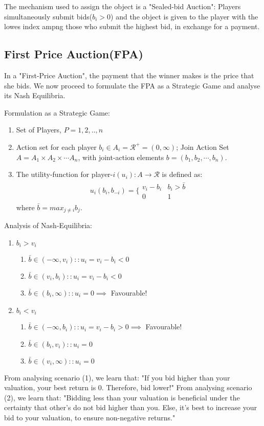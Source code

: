 \documentclass[11pt]{article}
\theoremstyle{definition}
\begin{document}
The mechanism used to assign the object is a "Sealed-bid Auction":
Players simultaneously submit bids($b_i > 0$) and the object is given to the player with the lowes index ampng those who submit the highest bid, in exchange for a payment. 

\subsection{First Price Auction(FPA)}
In a "First-Price Auction", the payment that the winner makes is the price that she bids. We now proceed to formulate the FPA as a Strategic Game and analyse its Nash Equilibria. 

Formulation as a Strategic Game:
\begin{enumerate}
\item Set of Players, $P = {1,2, .., n}$
\item Action set for each player $b_i \in A_i = \mathcal{R}^{+}=(0,\infty)$; 
Join Action Set $A = A_1 \times A_2 \times \cdots A_n$, with joint-action elements $b = (b_1, b_2, \cdots, b_n)$.
\item The utility-function for player-$i (u_i): A \rightarrow \mathcal{R} $ is defined as:
\begin{align}
u_i(b_i,b_{-i}) = \bigg\{\begin{array}{cc}v_i - b_i & b_i > \bar{b}\\ 0 & 1\end{array} \label{eq:FPA_utility}
\end{align}
where $\bar{b} = max_{j \neq i} b_j$.
\end{enumerate}

Analysis of Nash-Equilibria:
\begin{enumerate}
\item $b_i > v_i$
\begin{enumerate}
\item $\bar{b} \in (-\infty,v_i) \colon\colon u_i = v_i - b_i < 0$
\item $\bar{b} \in (v_i,b_i) \colon \colon u_i = v_i - b_i < 0$ 
\item $\bar{b} \in (b_i, \infty) \colon\colon u_i = 0 \implies$ Favourable! 
\end{enumerate}
\item $b_i < v_i$
\begin{enumerate}
\item $\bar{b} \in (-\infty,b_i) \colon\colon u_i = v_i - b_i > 0 \implies $ Favourable! 
\item $\bar{b} \in (b_i,v_i) \colon \colon u_i =  0$ 
\item $\bar{b} \in (v_i, \infty) \colon\colon u_i = 0$ 
\end{enumerate}
\end{enumerate}
From analysing scenario (1), we learn that:
"If you bid higher than your valuation, your best return is 0. Therefore, bid lower!"
From analysing scenario (2), we learn that:
"Bidding less than your valuation is beneficial under the certainty that other's do not bid higher than you. Else, it's best to increase your  bid to your valuation, to ensure non-negative returns."
\end{document}
